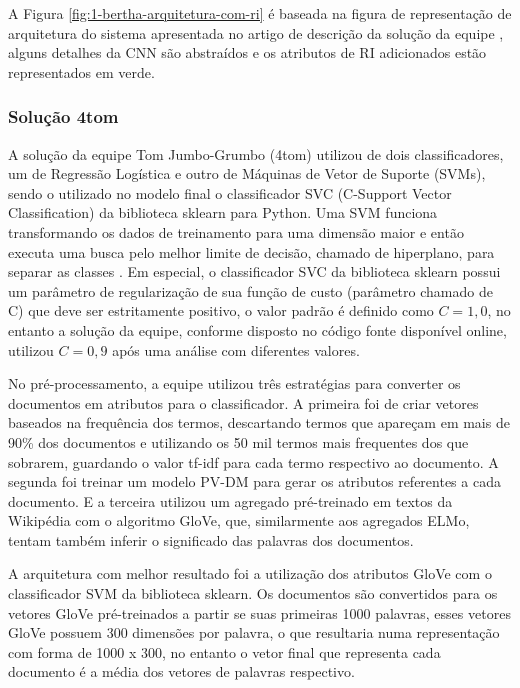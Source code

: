 				

				A Figura \ref{fig:1-bertha-arquitetura-com-ri} é baseada na figura de representação de arquitetura do sistema apresentada no artigo de descrição da solução da equipe \cite{jiang-etal-2019-team}, alguns detalhes da CNN são abstraídos e os atributos de RI adicionados estão representados em verde.


			\subsubsection{Solução 4\underscore{}tom}
				A solução da equipe Tom Jumbo-Grumbo (4\underscore{}tom) utilizou de dois classificadores, um de Regressão Logística e outro de Máquinas de Vetor de Suporte (SVMs), sendo o utilizado no modelo final o classificador SVC (C-Support Vector Classification) da biblioteca sklearn para Python.
				Uma SVM funciona transformando os dados de treinamento para uma dimensão maior e então executa uma busca pelo melhor limite de decisão, chamado de hiperplano, para separar as classes \cite[p.~408]{Han:2011:DMC:1972541}.
				Em especial, o classificador SVC da biblioteca sklearn possui um parâmetro de regularização de sua função de custo (parâmetro chamado de C) que deve ser estritamente positivo, o valor padrão é definido como $C = 1,0$, no entanto a solução da equipe, conforme disposto no código fonte disponível online, utilizou $C = 0,9$ após uma análise com diferentes valores.

				No pré-processamento, a equipe utilizou três estratégias para converter os documentos em atributos para o classificador.
				A primeira foi de criar vetores baseados na frequência dos termos, descartando termos que apareçam em mais de 90\% dos documentos e utilizando os 50 mil termos mais frequentes dos que sobrarem, guardando o valor tf-idf para cada termo respectivo ao documento.
				A segunda foi treinar um modelo PV-DM para gerar os atributos referentes a cada documento.
				E a terceira utilizou um agregado pré-treinado em textos da Wikipédia com o algoritmo GloVe, que, similarmente aos agregados ELMo, tentam também inferir o significado das palavras dos documentos.

				A arquitetura com melhor resultado foi a utilização dos atributos GloVe com o classificador SVM da biblioteca sklearn.
				Os documentos são convertidos para os vetores GloVe pré-treinados a partir se suas primeiras 1000 palavras, esses vetores GloVe possuem 300 dimensões por palavra, o que resultaria numa representação com forma de 1000 x 300, no entanto o vetor final que representa cada documento é a média dos vetores de palavras respectivo.

